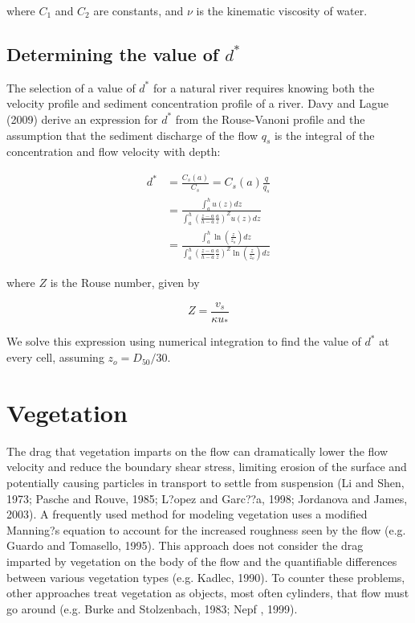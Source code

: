 \documentclass[11pt]{article}
\begin{document}
\noindent where $C_1$ and $C_2$ are constants, and $\nu$ is the kinematic viscosity of water. 

\subsection{Determining the value of $d^*$}
The selection of a value of $d^*$ for a natural river requires knowing both the velocity profile and sediment concentration profile of a river. Davy and Lague (2009) derive an expression for $d^*$ from the Rouse-Vanoni profile and the assumption that the sediment discharge of the flow $q_s$ is the integral of the concentration and flow velocity with depth:

\begin{equation}
\begin{split}
d^* & = \frac{C_s(a)}{C_s} = C_s(a) \frac{q}{q_s} \\
& = \frac{\int_{a}^{h} u(z) dz}{\int_{a}^{h} (\frac{z-a}{h-a}\frac{a}{z})^Z u(z) dz} \\
& = \frac{\int_{a}^{h} \ln{(\frac{z}{z_o})} dz}{\int_{a}^{h} (\frac{z-a}{h-a}\frac{a}{z})^Z \ln{(\frac{z}{z_o})} dz}
\end{split}
\end{equation} 

\noindent where $Z$ is the Rouse number, given by

\begin{equation}
Z = \frac{v_s}{\kappa u_*}
\end{equation}

We solve this expression using numerical integration to find the value of $d^*$ at every cell, assuming $z_o = D_{50}/30$.

\section{Vegetation}

The drag that vegetation imparts on the flow can dramatically lower the flow velocity and reduce the boundary shear stress, limiting erosion of the surface and potentially causing particles in transport to settle from suspension (Li and Shen, 1973; Pasche and Rouve, 1985; L?opez and Garc??a, 1998; Jordanova and James, 2003). A frequently used method for modeling vegetation uses a modified Manning?s equation to account for the increased roughness seen by the flow (e.g. Guardo and Tomasello, 1995). This approach does not consider the drag imparted by vegetation on the body of the flow and the quantifiable differences between various vegetation types (e.g. Kadlec, 1990). To counter these problems, other approaches treat vegetation as objects, most often cylinders, that flow must go around (e.g. Burke and Stolzenbach, 1983; Nepf , 1999).
\end{document}
